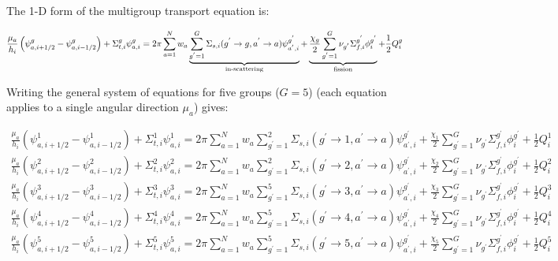 \documentclass[10pt]{article}
\newcommand*\circled[1]{\tikz[baseline=(char.base)]{
            \node[shape=circle,draw,inner sep=2pt] (char) {#1};}}
\begin{document}
\circled{4} The 1-D form of the multigroup transport equation is:

\begin{equation}
\frac{\mu_a}{h_i}\left(\psi_{a,i+1/2}^g-\psi_{a,i-1/2}^g\right)+\Sigma_{t,i}^g\psi_{a,i}^g=2\pi\sum_{a=1}^{N}w_a\underbrace{\sum_{g^{'}=1}^G\Sigma_{s,i}(g^{'}\rightarrow g, a^{'}\rightarrow a)\psi_{a^{'},i}^{g^{'}}}_\text{in-scattering}+\underbrace{\frac{\chi_g}{2}\sum_{g^{'}=1}^{G}\nu_{g^{'}}\Sigma_{f,i}^{g^{'}}\phi_{i}^{g^{'}}}_\text{fission}+\frac{1}{2}Q_i^g\\
\end{equation}

Writing the general system of equations for five groups (\(G=5\)) (each equation applies to a single angular direction \(\mu_a\)) gives:

\begin{equation}
\begin{aligned}
\frac{\mu_a}{h_i}\left(\psi_{a,i+1/2}^1-\psi_{a,i-1/2}^1\right)+\Sigma_{t,i}^1\psi_{a,i}^1=2\pi\sum_{a=1}^{N}w_a\sum_{g^{'}=1}^2\Sigma_{s,i}(g^{'}\rightarrow 1, a^{'}\rightarrow a)\psi_{a^{'},i}^{g^{'}}+\frac{\chi_1}{2}\sum_{g^{'}=1}^{G}\nu_{g^{'}}\Sigma_{f,i}^{g^{'}}\phi_{i}^{g^{'}}+\frac{1}{2}Q_i^1\\
\frac{\mu_a}{h_i}\left(\psi_{a,i+1/2}^2-\psi_{a,i-1/2}^2\right)+\Sigma_{t,i}^2\psi_{a,i}^2=2\pi\sum_{a=1}^{N}w_a\sum_{g^{'}=1}^2\Sigma_{s,i}(g^{'}\rightarrow 2, a^{'}\rightarrow a)\psi_{a^{'},i}^{g^{'}}+\frac{\chi_2}{2}\sum_{g^{'}=1}^{G}\nu_{g^{'}}\Sigma_{f,i}^{g^{'}}\phi_{i}^{g^{'}}+\frac{1}{2}Q_i^2\\
\frac{\mu_a}{h_i}\left(\psi_{a,i+1/2}^3-\psi_{a,i-1/2}^3\right)+\Sigma_{t,i}^3\psi_{a,i}^3=2\pi\sum_{a=1}^{N}w_a\sum_{g^{'}=1}^5\Sigma_{s,i}(g^{'}\rightarrow 3, a^{'}\rightarrow a)\psi_{a^{'},i}^{g^{'}}+\frac{\chi_3}{2}\sum_{g^{'}=1}^{G}\nu_{g^{'}}\Sigma_{f,i}^{g^{'}}\phi_{i}^{g^{'}}+\frac{1}{2}Q_i^3\\
\frac{\mu_a}{h_i}\left(\psi_{a,i+1/2}^4-\psi_{a,i-1/2}^4\right)+\Sigma_{t,i}^4\psi_{a,i}^4=2\pi\sum_{a=1}^{N}w_a\sum_{g^{'}=1}^5\Sigma_{s,i}(g^{'}\rightarrow 4, a^{'}\rightarrow a)\psi_{a^{'},i}^{g^{'}}+\frac{\chi_4}{2}\sum_{g^{'}=1}^{G}\nu_{g^{'}}\Sigma_{f,i}^{g^{'}}\phi_{i}^{g^{'}}+\frac{1}{2}Q_i^4\\
\frac{\mu_a}{h_i}\left(\psi_{a,i+1/2}^5-\psi_{a,i-1/2}^5\right)+\Sigma_{t,i}^5\psi_{a,i}^5=2\pi\sum_{a=1}^{N}w_a\sum_{g^{'}=1}^5\Sigma_{s,i}(g^{'}\rightarrow 5, a^{'}\rightarrow a)\psi_{a^{'},i}^{g^{'}}+\frac{\chi_5}{2}\sum_{g^{'}=1}^{G}\nu_{g^{'}}\Sigma_{f,i}^{g^{'}}\phi_{i}^{g^{'}}+\frac{1}{2}Q_i^5\\
\end{aligned}
\end{equation}
\end{document}
